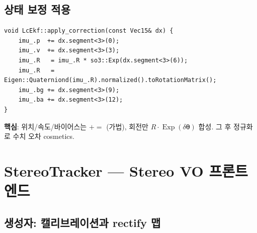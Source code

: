 \documentclass[11pt,a4paper,oneside]{report}
\DeclareMathOperator{\Exp}{Exp}
\begin{document}
\subsection{상태 보정 적용}

\begin{lstlisting}[style=cpp,caption={\texttt{lc\_ekf.cpp:70-77}}]
void LcEkf::apply_correction(const Vec15& dx) {
    imu_.p  += dx.segment<3>(0);
    imu_.v  += dx.segment<3>(3);
    imu_.R   = imu_.R * so3::Exp(dx.segment<3>(6));
    imu_.R   = Eigen::Quaterniond(imu_.R).normalized().toRotationMatrix();
    imu_.bg += dx.segment<3>(9);
    imu_.ba += dx.segment<3>(12);
}
\end{lstlisting}

\textbf{핵심}: 위치/속도/바이어스는 \(+=\) (가법), 회전만 \(R \cdot \Exp(\delta\bm{\theta})\) 합성. 그 후 정규화로 수치 오차 cosmetics.

\section{StereoTracker — Stereo VO 프론트엔드}

\subsection{생성자: 캘리브레이션과 rectify 맵}
\end{document}
